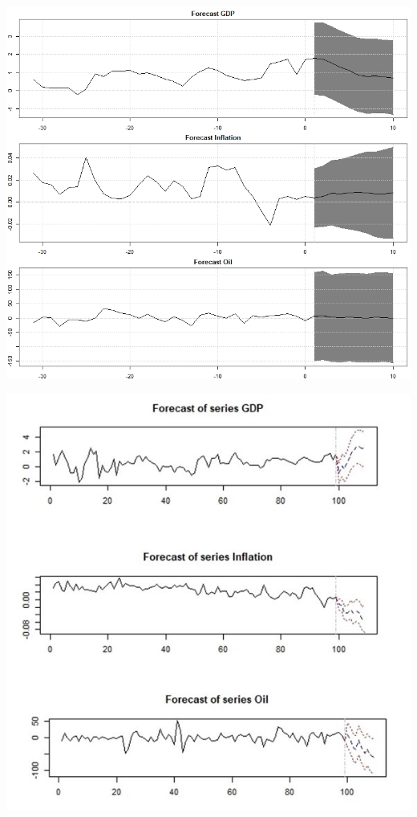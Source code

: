 \documentclass[11pt,preprint, authoryear]{elsarticle}
\let\origfigure\figure
\let\endorigfigure\endfigure
\renewenvironment{figure}[1][2] {
    \expandafter\origfigure\expandafter[H]
} {
    \endorigfigure
}
\numberwithin{equation}{section}
\numberwithin{figure}{section}
\numberwithin{table}{section}
\begin{document}
\begin{figure}[h]
\centering
\includegraphics[scale = 0.6]{for1.jpg}
\caption{BVAR forecasting results}
\label{123}
\end{figure}

\begin{figure}[h]
\centering
\includegraphics[scale = 0.8]{forcast.jpg}
\caption{VAR forecasting results}
\label{1234}
\end{figure}
\end{document}
